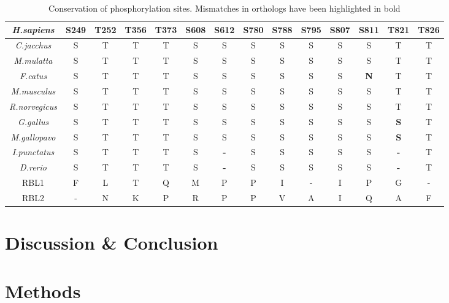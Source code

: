 \documentclass{article}
\begin{document}
\begin{table}[h]
	\centering
	\begin{tabular}{ |c|c|c|c|c|c|c|c|c|c|c|c|c|c|}
		\hline
		\textit{H.sapiens} & S249 & T252 & T356 & T373 & S608 & S612 & S780 & S788 & S795 & S807 & S811 & T821 & T826 \\
		\hline
		\textit{C.jacchus} & S & T & T & T & S & S & S & S & S & S & S & T & T\\
		\textit{M.mulatta} & S & T & T & T & S & S & S & S & S & S & S & T & T\\
		\textit{F.catus} & S & T & T & T & S & S & S & S & S & S & \textbf{N} & T & T\\
		\textit{M.musculus} & S & T & T & T & S & S & S & S & S & S & S & T & T\\
		\textit{R.norvegicus}  & S & T & T & T & S & S & S & S & S & S & S & T & T\\
		\textit{G.gallus} & S & T & T & T & S & S & S & S & S & S & S & \textbf{S} & T\\
		\textit{M.gallopavo} & S & T & T & T & S & S & S & S & S & S & S & \textbf{S} & T\\
		\textit{I.punctatus} & S & T & T & T & S & \textbf{-} & S & S & S & S & S & \textbf{-} & T\\
		\textit{D.rerio} & S & T & T & T & S & \textbf{-} & S & S & S & S & S & \textbf{-} & T\\
		\hline
		RBL1 & F & L & T & Q & M & P & P & I & - & I & P & G & -\\
		RBL2 & - & N & K & P & R & P & P & V & A & I & Q & A & F\\
		\hline
	\end{tabular}
	\caption{Conservation of phosphorylation sites. Mismatches in orthologs have been highlighted in bold}
	\label{tab:align}
\end{table}



\section{Discussion \& Conclusion}



\section{Methods}
\end{document}

